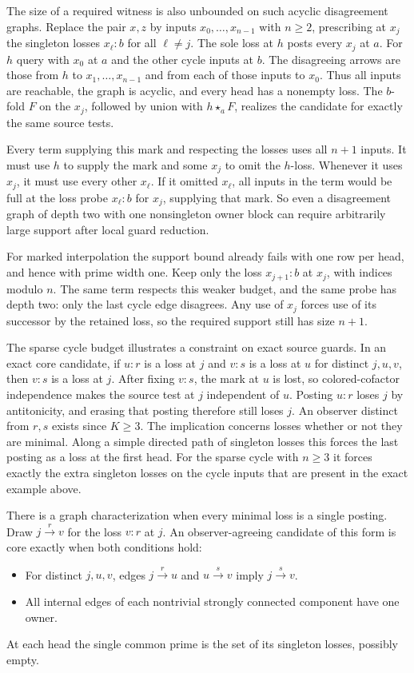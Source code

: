 The size of a required witness is also unbounded on
such acyclic disagreement graphs. Replace the pair
$x,z$ by inputs $x_0,\ldots,x_{n-1}$ with $n\ge2$,
prescribing at $x_j$ the singleton losses $x_\ell{:}b$
for all $\ell\ne j$.
The sole loss at $h$ posts every $x_j$ at $a$.
For $h$ query with $x_0$ at $a$ and the other cycle
inputs at $b$. The disagreeing arrows are those
from $h$ to $x_1,\ldots,x_{n-1}$ and from each
of those inputs to $x_0$. Thus all inputs are
reachable, the graph is acyclic, and every head has
a nonempty loss. The $b$-fold $F$ on the $x_j$,
followed by union with $h\star_a F$, realizes the
candidate for exactly the same source tests.

Every term supplying this mark and respecting the
losses uses all $n+1$ inputs. It must use $h$ to
supply the mark and some $x_j$ to omit the
$h$-loss. Whenever it uses $x_j$, it must use
every other $x_\ell$. If it omitted $x_\ell$,
all inputs in the term would be full at the loss
probe $x_\ell{:}b$ for $x_j$, supplying that mark.
So even a disagreement graph of depth two with
one nonsingleton owner block can require arbitrarily
large support after local guard reduction.

For marked interpolation the support bound already
fails with one row per head, and hence with prime
width one. Keep only the loss $x_{j+1}{:}b$ at $x_j$,
with indices modulo $n$. The same term respects this
weaker budget, and the same probe has depth two:
only the last cycle edge disagrees. Any use of
$x_j$ forces use of its successor by the retained
loss, so the required support still has size $n+1$.

The sparse cycle budget illustrates a constraint on
exact source guards. In an exact core candidate, if
$u{:}r$ is a loss at $j$ and $v{:}s$ is a loss at
$u$ for distinct $j,u,v$, then $v{:}s$ is a loss at
$j$. After fixing $v{:}s$, the mark at $u$ is lost,
so colored-cofactor independence makes the source
test at $j$ independent of $u$. Posting $u{:}r$
loses $j$ by antitonicity, and erasing that posting
therefore still loses $j$. An observer distinct from
$r,s$ exists since $K\ge3$. The implication concerns
losses whether or not they are minimal. Along a
simple directed path of singleton losses this forces
the last posting as a loss at the first head.
For the sparse cycle with $n\ge3$ it forces exactly
the extra singleton losses on the cycle inputs that
are present in the exact example above.

There is a graph characterization when every minimal
loss is a single posting. Draw $j\xrightarrow{r}v$
for the loss $v{:}r$ at $j$. An observer-agreeing
candidate of this form is core exactly when both
conditions hold:
\begin{itemize}
\item For distinct $j,u,v$, edges $j\xrightarrow{r}u$
and $u\xrightarrow{s}v$ imply $j\xrightarrow{s}v$.
\item All internal edges of each nontrivial strongly
connected component have one owner.
\end{itemize}
At each head the single common prime is the set of
its singleton losses, possibly empty.

